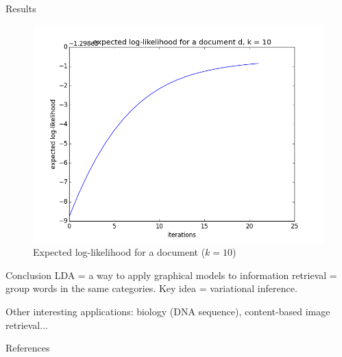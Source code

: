 \documentclass[final]{beamer}
\newlength{\onecolwid}
\begin{document}
\begin{frame}[t]
\begin{columns}[t]
\begin{column}{\onecolwid}
\begin{block}{Results}
\begin{figure}[ht!]
\begin{center}
\includegraphics[width=0.5\linewidth]{../img/k=10/log_likelihood_document_k=10.png}
\caption{Expected log-likelihood for a document ($k=10$)}
\end{center}
\end{figure}

\end{block}


\begin{block}{Conclusion}
LDA = a way to apply graphical models to information retrieval = group words in the same categories. Key idea = variational inference. 

Other interesting applications: biology (DNA sequence), content-based image retrieval$\ldots$
\end{block}


\begin{block}{References}

\nocite{*} %
\small{
\vspace{0.75in}}

\end{block}




\end{column}
\end{columns}
\end{frame}
\end{document}
